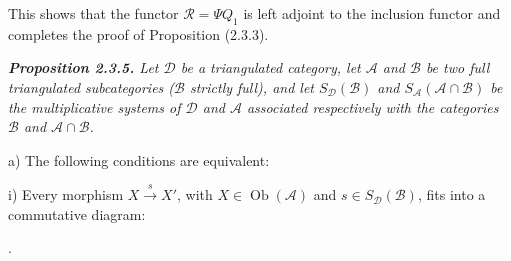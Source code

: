 This shows that the functor $\mathcal R=\Psi Q_1$ is left adjoint to the
inclusion functor and completes the proof of Proposition (2.3.3).

\begingroup\itshape
{}
\medskip
\noindent\textbf{Proposition 2.3.5.}\quad
{}
Let $\mathcal D$ be a triangulated category, let $\mathcal A$ and
$\mathcal B$ be two full triangulated subcategories ($\mathcal B$ strictly
full), and let $S_{\mathcal D}(\mathcal B)$ and
$S_{\mathcal A}(\mathcal A\cap\mathcal B)$ be the multiplicative systems
of $\mathcal D$ and $\mathcal A$ associated respectively with the
categories $\mathcal B$ and $\mathcal A\cap\mathcal B$.

\par\noindent a) The following conditions are equivalent:

\par\noindent\hspace{1.2em}i) Every morphism
$X\xrightarrow{s}X'$, with $X\in\operatorname{Ob}(\mathcal A)$ and
$s\in S_{\mathcal D}(\mathcal B)$, fits into a commutative diagram:

\begin{center}
  \quad .
\end{center}
\endgroup
\endgroup
